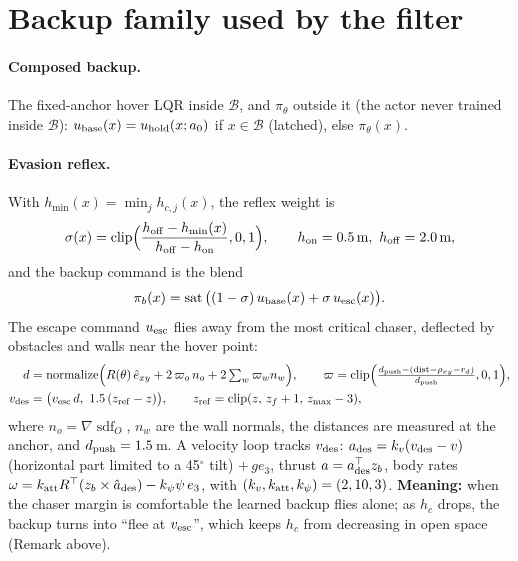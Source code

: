 \documentclass[11pt]{article}
\newcommand{\sat}{\operatorname{sat}}
\newcommand{\clip}{\operatorname{clip}}
\newcommand{\sdf}{\operatorname{sdf}}
\newcommand{\Base}{\mathcal{B}}
\begin{document}
\section{Backup family used by the filter}\label{sec:family}

\paragraph{Composed backup.} The fixed-anchor hover LQR inside $\Base$, and $\pi_\theta$ outside it (the actor never trained inside $\Base$):
$u_{\rm base}(x)=u_{\rm hold}(x;a_0)$ if $x\in\Base$ (latched), else $\pi_\theta(x)$.

\paragraph{Evasion reflex.} With $h_{\min}(x)=\min_j h_{c,j}(x)$, the reflex weight is
\begin{equation}
\sigma(x)=\clip\!\Big(\frac{h_{\rm off}-h_{\min}(x)}{h_{\rm off}-h_{\rm on}},0,1\Big),\qquad h_{\rm on}=0.5\text{\,m},\ h_{\rm off}=2.0\text{\,m},
\end{equation}
and the backup command is the blend
\begin{equation}
\pi_b(x)=\sat\big((1-\sigma)\,u_{\rm base}(x)+\sigma\,u_{\rm esc}(x)\big).
\end{equation}
The escape command $u_{\rm esc}$ flies away from the most critical chaser, deflected by obstacles and walls near the hover point:
\begin{align}
d&=\mathrm{normalize}\Big(R(\theta)\,\hat e_{xy}+2\,\varpi_o\,n_o+2\textstyle\sum_w \varpi_w n_w\Big),\qquad
\varpi=\clip\!\Big(\frac{d_{\rm push}-(\text{dist}-\rho_{xy}-r_d)}{d_{\rm push}},0,1\Big),\\
v_{\rm des}&=\big(v_{\rm esc}\,d,\ 1.5\,(z_{\rm ref}-z)\big),\qquad z_{\rm ref}=\clip(z,\,z_f+1,\,z_{\max}-3),
\end{align}
where $n_o=\nabla\sdf_O$, $n_w$ are the wall normals, the distances are measured at the anchor, and $d_{\rm push}=1.5$\,m.
A velocity loop tracks $v_{\rm des}$: $a_{\rm des}=k_v(v_{\rm des}-v)$ (horizontal part limited to a 45$^\circ$ tilt) $+\,g e_3$, thrust $a=a_{\rm des}^\top z_b$, body rates $\omega=k_{\rm att}R^\top(z_b\times\hat a_{\rm des})-k_\psi\psi\,e_3$, with $(k_v,k_{\rm att},k_\psi)=(2,10,3)$.
\textbf{Meaning:} when the chaser margin is comfortable the learned backup flies alone; as $h_c$ drops, the backup turns into ``flee at $v_{\rm esc}$'', which keeps $h_c$ from decreasing in open space (Remark above).
\end{document}
